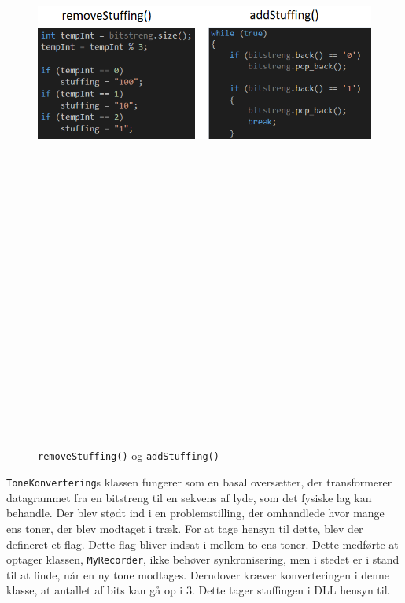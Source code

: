 \begin{figure}[ht]
	\centering
	\includegraphics[width=15cm,height=25cm,keepaspectratio]{pictures/stuffingTogether.png}
	\caption{\texttt{removeStuffing()} og \texttt{addStuffing()}}
	\label{fig:stufft}
\end{figure}

\hfill \break

\texttt{ToneKonvertering}s klassen fungerer som en basal oversætter, der transformerer datagrammet fra en bitstreng til en sekvens af lyde, som det fysiske lag kan behandle.
\newline
Der blev stødt ind i en problemstilling, der omhandlede hvor mange ens toner, der blev modtaget i træk. For at tage hensyn til dette, blev der defineret et flag. Dette flag bliver indsat i mellem to ens toner. Dette medførte at optager klassen, \texttt{MyRecorder}, ikke behøver synkronisering, men i stedet er i stand til at finde, når en ny tone modtages. Derudover kræver konverteringen i denne klasse, at antallet af bits kan gå op i 3. Dette tager stuffingen i DLL hensyn til.
\hfill \break

